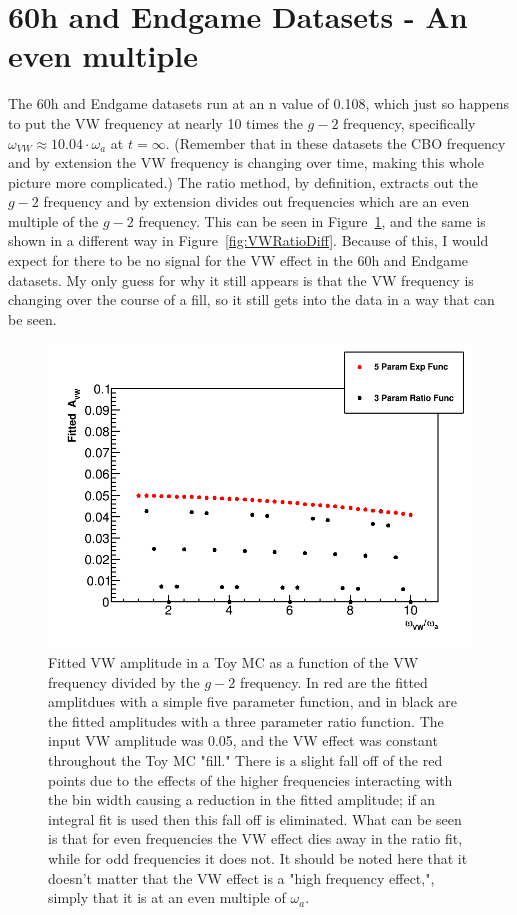 \documentclass[12pt,letterpaper]{article}
\newcommand{\figref}[1]{Figure~\ref{#1}}
\def\gmtwo{$g-2$\xspace}
\def\wa{$\omega_{a}$\xspace}
\begin{document}
\section{60h and Endgame Datasets - An even multiple}

The 60h and Endgame datasets run at an n value of 0.108, which just so happens to put the VW frequency at nearly 10 times the \gmtwo frequency, specifically $\omega_{VW} \approx 10.04 \cdot \omega_{a}$ at $t = \infty$. (Remember that in these datasets the CBO frequency and by extension the VW frequency is changing over time, making this whole picture more complicated.) The ratio method, by definition, extracts out the \gmtwo frequency and by extension divides out frequencies which are an even multiple of the \gmtwo frequency. This can be seen in \figref{fig:VW1x-10x}, and the same is shown in a different way in \figref{fig:VWRatioDiff}. Because of this, I would expect for there to be no signal for the VW effect in the 60h and Endgame datasets. My only guess for why it still appears is that the VW frequency is changing over the course of a fill, so it still gets into the data in a way that can be seen. 


\begin{figure}[]
    \centering
    \includegraphics[width=.8\textwidth]{Fitted_Avw_Vs_Wvw_1x-10x}
    \caption[]{Fitted VW amplitude in a Toy MC as a function of the VW frequency divided by the \gmtwo frequency. In red are the fitted amplitdues with a simple five parameter function, and in black are the fitted amplitudes with a three parameter ratio function. The input VW amplitude was 0.05, and the VW effect was constant throughout the Toy MC "fill." There is a slight fall off of the red points due to the effects of the higher frequencies interacting with the bin width causing a reduction in the fitted amplitude; if an integral fit is used then this fall off is eliminated. What can be seen is that for even frequencies the VW effect dies away in the ratio fit, while for odd frequencies it does not. It should be noted here that it doesn't matter that the VW effect is a "high frequency effect,", simply that it is at an even multiple of \wa.}
    \label{fig:VW1x-10x}
\end{figure}
\end{document}
